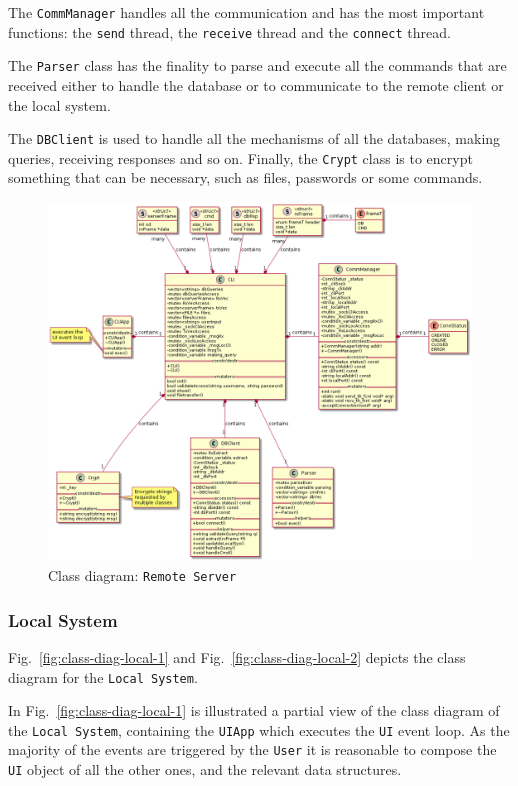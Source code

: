 The \texttt{CommManager} handles all the communication and has the most important functions: the \texttt{send} thread, the \texttt{receive} thread and the \texttt{connect} thread.

The \texttt{Parser} class has the finality to parse and execute all the commands that are received either to handle the database or to communicate to the remote client or the local system.

The  \texttt{DBClient} is used to handle all the mechanisms of all the databases, making queries, receiving responses and so on. Finally, the \texttt{Crypt} class is to encrypt something that can be necessary, such as files, passwords or some commands. 
%
\begin{figure}[htb!]
\centering
    \includegraphics[width=1.0\columnwidth]{./img/class-diag-rs-hugo.png}
  \caption{Class diagram: \texttt{Remote Server}}%
\label{fig:class-diag-rs}
\end{figure}

\subsubsection{Local System}
\label{sec:local-system-class}
%
Fig.~\ref{fig:class-diag-local-1} and Fig.~\ref{fig:class-diag-local-2} depicts the class diagram for the
\texttt{Local System}.

In Fig.~\ref{fig:class-diag-local-1} is illustrated a partial view of the class
diagram of the \texttt{Local System}, containing the \texttt{UIApp} which
executes the \texttt{UI} event loop. As the majority of the events are triggered
by the \texttt{User} it is reasonable to compose the \texttt{UI} object of all
the other ones, and the relevant data structures.

